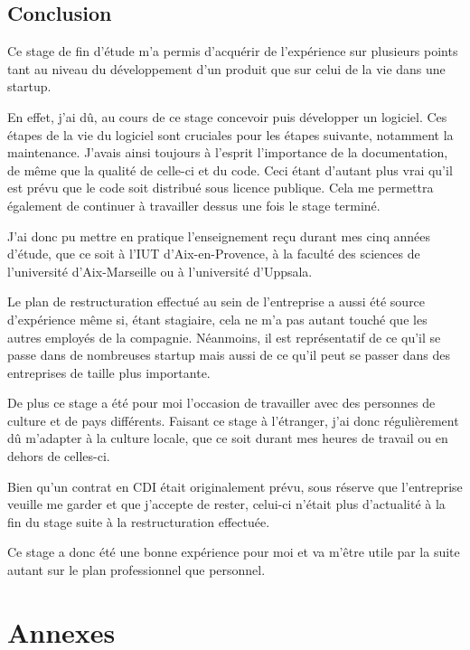\documentclass[a4paper,10pt, twoside]{report}
\begin{document}
\begin{spacing}{1.2}
\chapter{Conclusion}

Ce stage de fin d'étude m'a permis d'acquérir de l'expérience sur
plusieurs points tant au niveau du développement d'un produit que sur celui de
la vie dans une startup.

En effet, j'ai dû, au cours de ce stage concevoir puis développer un
logiciel. Ces étapes de la vie du logiciel sont cruciales pour les
étapes suivante, notamment la maintenance. J'avais ainsi toujours à
l'esprit l'importance de la documentation, de même que la qualité de
celle-ci et du code. Ceci étant d'autant plus vrai qu'il est prévu que le
code soit distribué sous licence publique. Cela me permettra également de
continuer à travailler dessus une fois le stage terminé.

J'ai donc pu mettre en pratique l'enseignement reçu durant mes cinq années
d'étude, que ce soit à l'IUT d'Aix-en-Provence, à la faculté des sciences de
l'université d'Aix-Marseille ou à l'université d'Uppsala.

Le plan de restructuration effectué au sein de l'entreprise a aussi été
source d'expérience même si, étant stagiaire, cela ne m'a pas autant
touché que les autres employés de la compagnie. Néanmoins, il est
représentatif de ce qu'il se passe dans de nombreuses startup mais aussi de
ce qu'il peut se passer dans des entreprises de taille plus importante.

De plus ce stage a été pour moi l'occasion de travailler avec des personnes
de culture et de pays différents. Faisant ce stage à l'étranger, j'ai donc
régulièrement dû m'adapter à la culture locale, que ce soit durant mes
heures de travail ou en dehors de celles-ci.

Bien qu'un contrat en CDI était originalement prévu, sous réserve que
l'entreprise veuille me garder et que j'accepte de rester, celui-ci n'était
plus d'actualité à la fin du stage suite à la restructuration effectuée.

Ce stage a donc été une bonne expérience pour moi et va m'être utile par
la suite autant sur le plan professionnel que personnel.

\newpage
\listoffigures
\listoftables



\appendix
\makeatletter
\def\@seccntformat#1{Annexe~\csname the#1\endcsname:\quad}
\makeatother
\part{Annexes}

\end{spacing}
\end{document}
